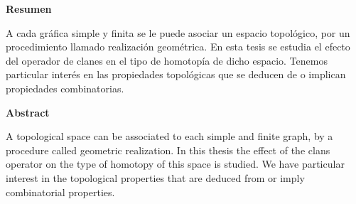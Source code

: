 \thispagestyle{empty}
\begin{flushleft}
  {\bfseries\Large Resumen}
\end{flushleft}

A cada gráfica simple y finita se le puede asociar un espacio topológico, por un procedimiento llamado realización geométrica. En esta tesis se estudia el efecto del operador de clanes en el tipo de homotopía de dicho espacio. Tenemos particular interés en las propiedades topológicas que se deducen de o implican propiedades combinatorias.

\vspace{2cm}

\begin{flushleft}
  {\bfseries\Large Abstract}
\end{flushleft}

A topological space can be associated to each simple and finite graph, by a procedure called geometric realization. In this thesis the effect of the clans operator on the type of homotopy of this space is studied. We have particular interest in the topological properties that are deduced from or imply combinatorial properties.



 \newpage \thispagestyle{empty}
